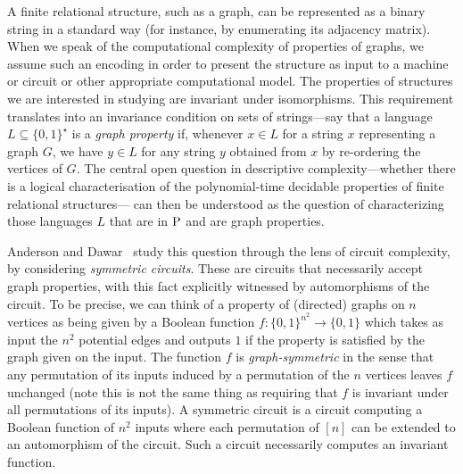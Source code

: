 \documentclass[../paper.tex]{subfiles}
\begin{document}
A finite relational structure, such as a graph, can be represented as a binary
string in a standard way (for instance, by enumerating its adjacency matrix).
When we speak of the computational complexity of properties of graphs, we assume
such an encoding in order to present the structure as input to a machine or
circuit or other appropriate computational model. The properties of structures
we are interested in studying are invariant under isomorphisms. This requirement
translates into an invariance condition on sets of strings---say that a language
$L \subseteq \{0,1\}^\star$ is a \emph{graph property} if, whenever $x \in L$
for a string $x$ representing a graph $G$, we have $y\in L$ for any string $y$
obtained from $x$ by re-ordering the vertices of $G$. The central open question
in descriptive complexity---whether there is a logical characterisation of the
polynomial-time decidable properties of finite relational structures--- can then
be understood as the question of characterizing those languages $L$ that are in
$\mathrm{P}$ and are graph properties.

Anderson and Dawar~\cite{AndersonD17} study this question through the lens of
circuit complexity, by considering \emph{symmetric circuits}. These are circuits
that necessarily accept graph properties, with this fact explicitly witnessed by
automorphisms of the circuit. To be precise, we can think of a property of
(directed) graphs on $n$ vertices as being given by a Boolean function $f:
\{0,1\}^{n^2} \rightarrow \{0,1\}$ which takes as input the $n^2$ potential
edges and outputs $1$ if the property is satisfied by the graph given on the
input. The function $f$ is \emph{graph-symmetric} in the sense that any
permutation of its inputs induced by a permutation of the $n$ vertices leaves
$f$ unchanged (note this is not the same thing as requiring that $f$ is
invariant under all permutations of its inputs). A symmetric circuit is a
circuit computing a Boolean function of $n^2$ inputs where each permutation of
$[n]$ can be extended to an automorphism of the circuit. Such a circuit
necessarily computes an invariant function.
\end{document}
